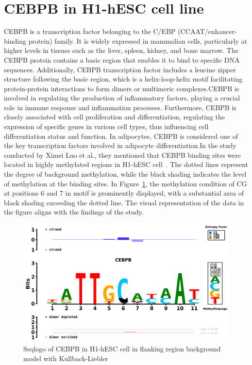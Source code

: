 \documentclass{PHlab-thesis}
\begin{document}
\section{CEBPB in H1-hESC cell line}
CEBPB is a transcription factor belonging to the C/EBP (CCAAT/enhancer-binding protein) family. It is widely expressed in mammalian cells, particularly at higher levels in tissues such as the liver, spleen, kidney, and bone marrow. The CEBPB protein contains a basic region that enables it to bind to specific DNA sequences. Additionally, CEBPB transcription factor includes a leucine zipper structure following the basic region, which is a helix-loop-helix motif facilitating protein-protein interactions to form dimers or multimeric complexes.CEBPB is involved in regulating the production of inflammatory factors, playing a crucial role in immune response and inflammation processes. Furthermore, CEBPB is closely associated with cell proliferation and differentiation, regulating the expression of specific genes in various cell types, thus influencing cell differentiation status and function. In adipocytes, CEBPB is considered one of the key transcription factors involved in adipocyte differentiation.In the study conducted by Ximei Luo et al., they mentioned that CEBPB binding sites were located in highly methylated regions in H1-hESC cell~\cite{luo2021effects}. The dotted lines represent the degree of background methylation, while the black shading indicates the level of methylation at the binding sites. In Figure~\ref{fig:CEBPBFlanking}, the methylation condition of CG at positions 6 and 7 in motif is prominently displayed, with a substantial area of black shading exceeding the dotted line. The visual representation of the data in the figure aligns with the findings of the study.
\begin{figure}[H]
	\centering
	\includegraphics[scale=0.55]{figures/CEBPB.png}
	\caption{Seqlogo of CEBPB in H1-hESC cell in flanking region background model with Kullback-Liebler}
	\label{fig:CEBPBFlanking} 
\end{figure}
\end{document}
